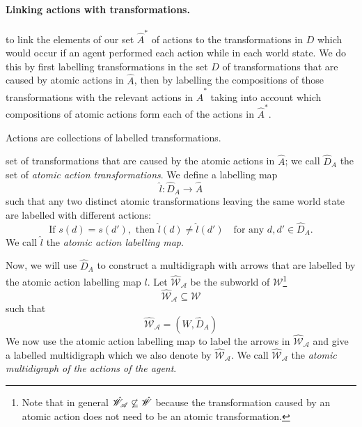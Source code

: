 \paragraph{Linking actions with transformations.}

 to link the elements of our set $\hat{A}^{*}$ of actions to the transformations in $D$ which would occur if an agent performed each action while in each world state.
We do this by first labelling transformations in the set $D$ of transformations that are caused by atomic actions in $\hat{A}$, then by labelling the compositions of those transformations with the relevant actions in $\hat{A}^{*}$ taking into account which compositions of atomic actions form each of the actions in $\hat{A}^{*}$.

\begin{postulate}
	Actions are collections of labelled transformations.
\end{postulate}

 set of transformations that are caused by the atomic actions in $\hat{A}$; we call $\hat{D}_{A}$ the set of \emph{atomic action transformations}.
We define a labelling map
\begin{equation}
    \hat{l}: \hat{D}_{A} \to \hat{A}
\end{equation}
such that any two distinct atomic transformations leaving the same world state are labelled with different actions:
\begin{equation}
  \text{If } s(d) = s(d'), \text{ then } \hat{l}(d) \neq \hat{l}(d') \quad \text{for any } d, d' \in \hat{D}_{A}.
\end{equation}
We call $\hat{l}$ the \emph{atomic action labelling map}.

Now, we will use $\hat{D}_{A}$ to construct a multidigraph with arrows that are labelled by the atomic action labelling map $l$.
Let $\hat{\mathscr{W}}_{\mathscr{A}}$ be the subworld of $\mathscr{W}$\footnote{
    Note that in general $\hat{\mathscr{W}}_{\mathscr{A}} \centernot\subseteq \hat{\mathscr{W}}$ because the transformation caused by an atomic action does not need to be an atomic transformation.
}
\begin{equation}
    \hat{\mathscr{W}}_{\mathscr{A}} \subseteq \mathscr{W}
\end{equation}
such that
\begin{equation}
    \hat{\mathscr{W}}_{\mathscr{A}} = (W, \hat{D}_{A})
\end{equation}
We now use the atomic action labelling map to label the arrows in $\hat{\mathscr{W}}_{\mathscr{A}}$ and give a labelled multidigraph which we also denote by $\hat{\mathscr{W}}_{\mathscr{A}}$.
We call $\hat{\mathscr{W}}_{\mathscr{A}}$ the \emph{atomic multidigraph of the actions of the agent}.

